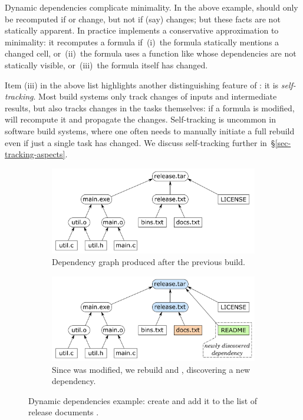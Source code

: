 Dynamic dependencies complicate minimality.  In the above example, 
should only be recomputed if  or  change, but not if (say)
 changes; but these facts are not statically apparent. In practice
\Excel implements a conservative approximation to minimality: it recomputes a
formula if~(i)~the formula statically mentions a changed cell, or~(ii)~the formula uses a
function like  whose dependencies are not statically visible,
or~(iii)~the formula itself has changed.

Item (iii) in the above list highlights another distinguishing feature of \Excel: it
is \emph{self-tracking}. Most build systems only track changes of inputs and
intermediate results, but \Excel also tracks changes in the tasks themselves: if
a formula is modified, \Excel will recompute it and propagate the changes.
Self-tracking is uncommon in software build systems, where one often needs to
manually initiate a full rebuild even if just a single task has changed.
We discuss self-tracking further in~\S\ref{sec-tracking-aspects}.

\begin{figure}
\begin{subfigure}[b]{0.90\linewidth}
\centerline{\includegraphics[scale=0.28]{fig/shake-example.pdf}}
\caption{Dependency graph produced after the previous build.}
\end{subfigure}
\begin{subfigure}[b]{0.90\linewidth}
\centerline{\includegraphics[scale=0.28]{fig/shake-example-rebuild.pdf}}
\caption{Since  was modified, we rebuild  and
, discovering a new dependency.}
\end{subfigure}
\vspace{-2mm}
\caption{Dynamic dependencies example: create  and add it to the
list of release documents .\label{fig-shake}}
\vspace{-4mm}
\end{figure}

